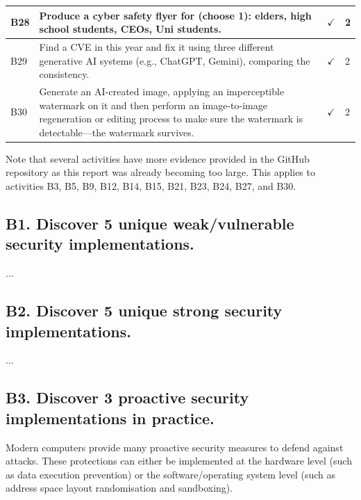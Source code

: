 \documentclass[titlepage]{article}
\begin{document}
\begin{center}
\begin{tabular}{ |p{4em}|p{30em}|C{6em}|C{5em}| }
            B28 & Produce a cyber safety flyer for (choose 1): elders, high school students, CEOs, Uni students. & $\checkmark$ & 2 \\
            \hline
            B29 & Find a CVE in this year and fix it using three different generative AI systems (e.g., ChatGPT, Gemini), comparing the consistency. & $\checkmark$ & 2 \\
            \hline
            B30 & Generate an AI-created image, applying an imperceptible watermark on it and then perform an image-to-image regeneration or editing process to make sure the watermark is detectable---the watermark survives. & $\checkmark$ & 2 \\
            \hline
        \end{tabular}
    \end{center}

    Note that several activities have more evidence provided in the GitHub repository as this report was already becoming too large.
    This applies to activities B3, B5, B9, B12, B14, B15, B21, B23, B24, B27, and B30.
    
    \newpage

    \subsection*{\centering B1. Discover 5 unique weak/vulnerable security implementations.}
        ...

    \newpage

    \subsection*{\centering B2. Discover 5 unique strong security implementations.}
        ...

    \newpage

    \subsection*{\centering B3. Discover 3 proactive security implementations in practice.}
        Modern computers provide many proactive security measures to defend
        against attacks. These protections can either be implemented at the
        hardware level (such as data execution prevention) or the
        software/operating system level (such as address space layout
        randomisation and sandboxing).

        \bigskip
\end{document}
